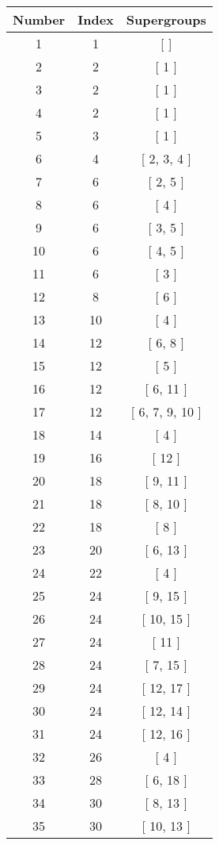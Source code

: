 \begin{center}
\begin{longtable}[H]{|| c c c ||}
\hline
Number & Index & Supergroups \\ 
\hline
1 & 1 & [ ] \\ 
\hline
2 & 2 & [ 1 ] \\ 
\hline
3 & 2 & [ 1 ] \\ 
\hline
4 & 2 & [ 1 ] \\ 
\hline
5 & 3 & [ 1 ] \\ 
\hline
6 & 4 & [ 2, 3, 4 ] \\ 
\hline
7 & 6 & [ 2, 5 ] \\ 
\hline
8 & 6 & [ 4 ] \\ 
\hline
9 & 6 & [ 3, 5 ] \\ 
\hline
10 & 6 & [ 4, 5 ] \\ 
\hline
11 & 6 & [ 3 ] \\ 
\hline
12 & 8 & [ 6 ] \\ 
\hline
13 & 10 & [ 4 ] \\ 
\hline
14 & 12 & [ 6, 8 ] \\ 
\hline
15 & 12 & [ 5 ] \\ 
\hline
16 & 12 & [ 6, 11 ] \\ 
\hline
17 & 12 & [ 6, 7, 9, 10 ] \\ 
\hline
18 & 14 & [ 4 ] \\ 
\hline
19 & 16 & [ 12 ] \\ 
\hline
20 & 18 & [ 9, 11 ] \\ 
\hline
21 & 18 & [ 8, 10 ] \\ 
\hline
22 & 18 & [ 8 ] \\ 
\hline
23 & 20 & [ 6, 13 ] \\ 
\hline
24 & 22 & [ 4 ] \\ 
\hline
25 & 24 & [ 9, 15 ] \\ 
\hline
26 & 24 & [ 10, 15 ] \\ 
\hline
27 & 24 & [ 11 ] \\ 
\hline
28 & 24 & [ 7, 15 ] \\ 
\hline
29 & 24 & [ 12, 17 ] \\ 
\hline
30 & 24 & [ 12, 14 ] \\ 
\hline
31 & 24 & [ 12, 16 ] \\ 
\hline
32 & 26 & [ 4 ] \\ 
\hline
33 & 28 & [ 6, 18 ] \\ 
\hline
34 & 30 & [ 8, 13 ] \\ 
\hline
35 & 30 & [ 10, 13 ] \\ 

\end{longtable}
\end{center}

